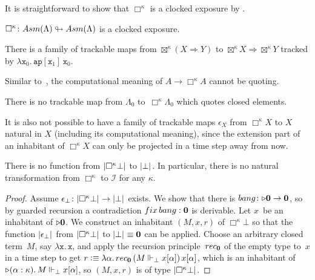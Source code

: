 \documentclass[a4paper,UKenglish,numberwithinsect,cleveref,thm-restate,draft]{lipics-v2021}
\numberwithin{equation}{section}
\theoremstyle{definition}
\theoremstyle{plain}
\begin{document}
It is straightforward to show that $\Box^\kappa$ is a clocked exposure by .
\begin{theorem}\label{thm:GL-exposure}
  $\Box^\kappa \colon \Asm(\Lambda) \looparrowright \Asm(\Lambda)$ is a clocked exposure.
\end{theorem}

\begin{proposition}
There is a family of trackable maps
from $\boxtimes^\kappa (X \Rightarrow Y)$ to $\boxtimes^\kappa X \Rightarrow \boxtimes^\kappa Y$  tracked by $\lambda \mathtt{x}_0.\, \mathtt{ap}[\mathtt{x}_1] \, \mathtt{x}_0$.
\end{proposition}

Similar to~, the computational meaning of $A \to \Box^\kappa A$ cannot be quoting.
\begin{theorem}\label{thm:GL-no-quoting}
  There is no trackable map from $\Lambda_0$ to~$\Box^\kappa \Lambda_0$ which quotes closed elements.
\end{theorem}

It is also not possible to have a family of trackable maps $\epsilon_X$ from $\Box^\kappa X$ to $X$ natural in $X$ (including its computational meaning), since the extension part of an inhabitant of $\Box^\kappa X$ can only be projected in a time step away from now.%
\begin{theorem}\label{thm:GL-no-eval}
  There is no function from $\mathopen{}\left|\Box^\kappa \bot\right|_{}^{}\mathclose{}$ to $\mathopen{}\left|\bot\right|_{}^{}\mathclose{}$.
  In particular, there is no natural transformation from $\Box^\kappa$ to $\mathcal{I}$ for any $\kappa$.
\end{theorem}
\begin{proof}
  Assume $\epsilon_\bot \colon \mathopen{}\left|\Box^\kappa \bot\right|_{}^{}\mathclose{} \to \mathopen{}\left|\bot\right|_{}^{}\mathclose{}$ exists. 
  We show that there is $\mathsf{bang}\colon \laterp \Empty \to \Empty$, so by guarded recursion a contradiction $\mathsf{fix}\,\mathsf{bang} : \Empty$ is derivable.
  Let $x$~be an inhabitant of $\mathord{\triangleright} \mathbf{0}$. We construct an inhabitant $(M, x, r)$ of $\Box^\kappa \bot$
  so that the function $\mathopen{}\left|\epsilon_\bot\right|_{}^{}\mathclose{}$ from $\mathopen{}\left|\Box^\kappa \bot\right|_{}^{}\mathclose{}$ to $\mathopen{}\left|\bot\right|_{}^{}\mathclose{} \equiv \mathbf{0}$ can be applied.
  Choose an arbitrary closed term~$M$, say $\mathtt{\lambda x.\, x}$, and apply the recursion principle~$\mathsf{rec}_{\Empty}$ of the empty type to~$x$ in a time step to get $r \defeq \lambda \alpha.\, \mathsf{rec}_{\Empty}\,(M \Vdash_\bot x[\alpha])\,x[\alpha]$, which is an inhabitant of $\mathord{\triangleright} (\alpha : \kappa) .\, M \Vdash_\bot x [\alpha]$, so $(M, x, r)$ is of type $\mathopen{}\left|\Box^\kappa \bot\right|_{}^{}\mathclose{}$. 
\end{proof}
\end{document}
